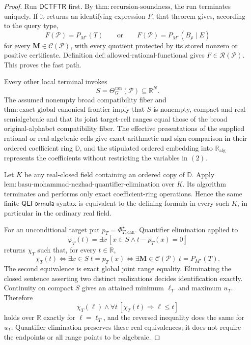 \documentclass{article}
\begin{document}
\begin{proof}
Run \(\mathsf{DCTFTR}\) first.  By
\(\mathrm{thm:recursion\text{-}soundness}\), the run terminates uniquely.  If it
returns an identifying expression \(F\), that theorem gives, according to the query
type,
\[
F(\mathcal P)=P_{M^\star}(T)
\qquad\text{or}\qquad
F(\mathcal P)=P_{M^\star}(B_\rho\mid E)
\tag{1}
\]
for every \(\mathbf M\in\mathcal C(\mathcal P)\), with every quotient protected by
its stored nonzero or positive certificate.  Definition
\(\mathrm{def:allowed\text{-}rational\text{-}functional}\) gives
\(F\in\mathscr R(\mathcal P)\).  This proves the fast path.

Every other local terminal invokes
\[
S=\Theta_G^{\mathrm{can}}(\mathcal P)\subseteq\mathbb R^N.
\tag{2}
\]
The assumed nonempty broad compatibility fiber and
\(\mathrm{thm:exact\text{-}global\text{-}canonical\text{-}frontier}\) imply that
\(S\) is nonempty, compact and real semialgebraic and that its joint target-cell
ranges equal those of the broad original-alphabet compatibility fiber.  The
effective presentations of the supplied rational or real-algebraic cells give exact
arithmetic and sign comparison in their ordered coefficient ring \(\mathbb D\), and
the stipulated ordered embedding into \(\mathbb R_{\mathrm{alg}}\) represents the
coefficients without restricting the variables in \((2)\).

Let \(K\) be any real-closed field containing an ordered copy of \(\mathbb D\).
Apply
\(\mathrm{lem:basu\text{-}mohammad\text{-}nezhad\text{-}quantifier\text{-}elimination}\)
over \(K\).  Its algorithm terminates and performs only exact coefficient-ring
operations.  Hence the same finite \(\mathsf{QEFormula}\) syntax is equivalent to
the defining formula in every such \(K\), in particular in the ordinary real field.

For an unconditional target put \(p_T=\Phi_{T,\mathrm{can}}^\star\).  Quantifier
elimination applied to
\[
\varphi_T(t)=\exists x\,[x\in S\wedge t-p_T(x)=0]
\tag{3}
\]
returns \(\chi_T\) such that, for every \(t\in\mathbb R\),
\[
\chi_T(t)
\Longleftrightarrow
\exists x\in S\;t=p_T(x)
\Longleftrightarrow
\exists\mathbf M\in\mathcal C(\mathcal P)\;
t=P_{M^\star}(T).
\tag{4}
\]
The second equivalence is exact global joint range equality.  Eliminating the closed
sentence asserting two distinct realizations decides identification exactly.
Continuity on compact \(S\) gives an attained minimum \(\ell_T\) and maximum
\(u_T\).  Therefore
\[
\chi_T(\ell)\wedge
\forall t\,[\chi_T(t)\Longrightarrow\ell\leq t]
\tag{5}
\]
holds over \(\mathbb R\) exactly for \(\ell=\ell_T\), and the reversed inequality
does the same for \(u_T\).  Quantifier elimination preserves these real
equivalences; it does not require the endpoints or all range points to be algebraic.


\end{proof}
\end{document}
